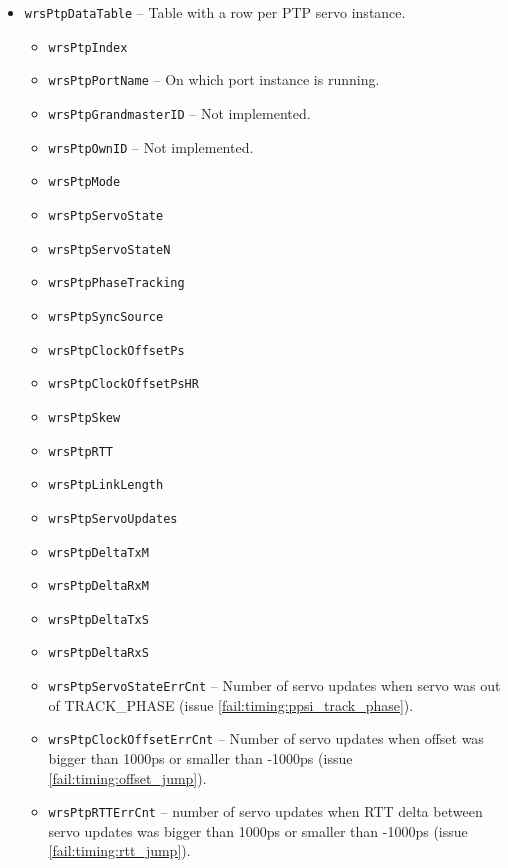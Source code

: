 \begin{itemize}
  \item \texttt{wrsPtpDataTable} -- Table with a row per PTP servo instance.
    \begin{itemize}
      \item \texttt{wrsPtpIndex}
      \item \texttt{wrsPtpPortName} -- On which port instance is running.
      \item \texttt{wrsPtpGrandmasterID} -- Not implemented.
      \item \texttt{wrsPtpOwnID} -- Not implemented.
      \item \texttt{wrsPtpMode}
      \item \texttt{wrsPtpServoState}
      \item \texttt{wrsPtpServoStateN}
      \item \texttt{wrsPtpPhaseTracking}
      \item \texttt{wrsPtpSyncSource}
      \item \texttt{wrsPtpClockOffsetPs}
      \item \texttt{wrsPtpClockOffsetPsHR}
      \item \texttt{wrsPtpSkew}
      \item \texttt{wrsPtpRTT}
      \item \texttt{wrsPtpLinkLength}
      \item \texttt{wrsPtpServoUpdates}
      \item \texttt{wrsPtpDeltaTxM}
      \item \texttt{wrsPtpDeltaRxM}
      \item \texttt{wrsPtpDeltaTxS}
      \item \texttt{wrsPtpDeltaRxS}
      \item \texttt{wrsPtpServoStateErrCnt} -- Number of servo updates when
	    servo was out of TRACK\_PHASE (issue
	    \ref{fail:timing:ppsi_track_phase}).
      \item \texttt{wrsPtpClockOffsetErrCnt} -- Number of servo updates when
	    offset was bigger than 1000ps or smaller than -1000ps (issue
	    \ref{fail:timing:offset_jump}).
      \item \texttt{wrsPtpRTTErrCnt} -- number of servo updates when RTT delta
	    between servo updates was bigger than 1000ps or smaller than
	    -1000ps (issue \ref{fail:timing:rtt_jump}).
    \end{itemize}


\end{itemize}
